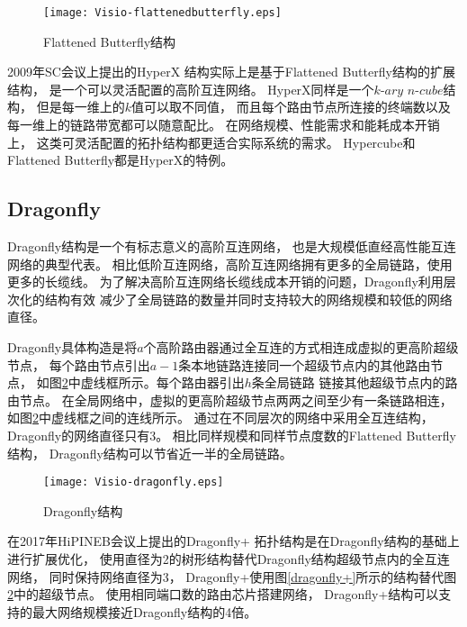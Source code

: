 \begin{figure}[htp]
  \centering
    \texttt{[image: Visio-flattenedbutterfly.eps]}
    \caption{Flattened Butterfly结构}
    \label{flattenedbutterfly}
\end{figure}

2009年SC会议上提出的HyperX
结构实际上是基于Flattened Butterfly结构的扩展结构，
是一个可以灵活配置的高阶互连网络。
HyperX同样是一个$k\textrm{-}ary$ $n\textrm{-}cube$结构，
但是每一维上的$k$值可以取不同值，
而且每个路由节点所连接的终端数以及每一维上的链路带宽都可以随意配比。
在网络规模、性能需求和能耗成本开销上，
这类可灵活配置的拓扑结构都更适合实际系统的需求。
Hypercube和Flattened Butterfly都是HyperX的特例。


\subsection{Dragonfly}

Dragonfly结构是一个有标志意义的高阶互连网络，
也是大规模低直经高性能互连网络的典型代表。
相比低阶互连网络，高阶互连网络拥有更多的全局链路，使用更多的长缆线。
为了解决高阶互连网络长缆线成本开销的问题，Dragonfly利用层次化的结构有效
减少了全局链路的数量并同时支持较大的网络规模和较低的网络直径。

Dragonfly具体构造是将$a$个高阶路由器通过全互连的方式相连成虚拟的更高阶超级节点，
每个路由节点引出$a-1$条本地链路连接同一个超级节点内的其他路由节点，
如图\ref{dragonfly}中虚线框所示。每个路由器引出$h$条全局链路
链接其他超级节点内的路由节点。
在全局网络中，虚拟的更高阶超级节点两两之间至少有一条链路相连，
如图\ref{dragonfly}中虚线框之间的连线所示。
通过在不同层次的网络中采用全互连结构，Dragonfly的网络直径只有3。
相比同样规模和同样节点度数的Flattened Butterfly结构，
Dragonfly结构可以节省近一半的全局链路。

\begin{figure}[htp]
  \centering
    \texttt{[image: Visio-dragonfly.eps]}
    \caption{Dragonfly结构}
       \label{dragonfly}
\end{figure}

在2017年HiPINEB会议上提出的Dragonfly+
拓扑结构是在Dragonfly结构的基础上进行扩展优化，
使用直径为2的树形结构替代Dragonfly结构超级节点内的全互连网络，
同时保持网络直径为3，
Dragonfly+使用图\ref{dragonfly+}所示的结构替代图\ref{dragonfly}中的超级节点。
使用相同端口数的路由芯片搭建网络，
Dragonfly+结构可以支持的最大网络规模接近Dragonfly结构的4倍。

